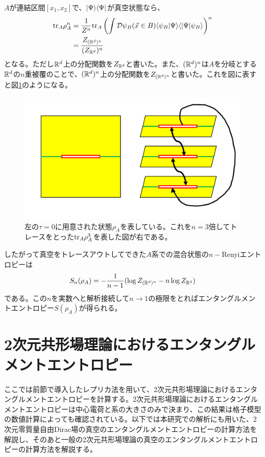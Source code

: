 $A$が連結区間$[x_1,x_2]$で、$|\Psi\rangle\langle\Psi |$が真空状態なら、
\begin{align}
\textnormal{tr}_A \rho_A^n &= \frac{1}{Z^n} \textnormal{tr}_A \left(\int \mathcal{D}\psi_B(\vec{x}\in B)\langle \psi_B|\Psi\rangle\langle |\Psi|\psi_B\rangle\right)^n\\
&=\frac{Z_{(\mathbb{R}^d)^n}}{(Z_{\mathbb{R}^d})^n}
\end{align}
となる。ただし$\mathbb{R}^d$上の分配関数を$Z_{\mathbb{R}^d}$と書いた。また、$(\mathbb{R}^d)^n$は$A$を分岐とする$\mathbb{R}^d$の$n$重被覆のことで、$(\mathbb{R}^d)^n$上の分配関数を$Z_{(\mathbb{R}^d)^n}$と書いた。これを図に表すと図\ref{fig:replicatrick}のようになる。
\begin{figure}[h]
	\centering
	\includegraphics[width=0.7\linewidth]{replicatrick.pdf}
	\caption{左の$\tau=0$に用意された状態$\rho_A$を表している。これを$n=3$倍してトレースをとった$\textnormal{tr}_A\rho_A^3$を表した図が右である。}
	\label{fig:replicatrick}
\end{figure}

したがって真空をトレースアウトしてできた$A$系での混合状態の$n-$Renyiエントロピーは
\begin{align}
S_n(\rho_{A})=-\frac{1}{n-1}(\log Z_{(\mathbb{R}^d)^n} -n \log Z_{\mathbb{R}^d})
\end{align}
である。この$n$を実数へと解析接続して$n\to 1$の極限をとればエンタングルメントエントロピー$S(\rho_A)$が得られる。

\section{2次元共形場理論におけるエンタングルメントエントロピー}\label{sec:EEcft2}
ここでは前節で導入したレプリカ法を用いて、2次元共形場理論におけるエンタングルメントエントロピーを計算する。2次元共形場理論におけるエンタングルメントエントロピーは中心電荷と系の大きさのみで決まり、この結果は格子模型の数値計算によっても確認されている。以下では本研究での解析にも用いた、2次元零質量自由Dirac場の真空のエンタングルメントエントロピーの計算方法を解説し、そのあと一般の2次元共形場理論の真空のエンタングルメントエントロピーの計算方法を解説する。

